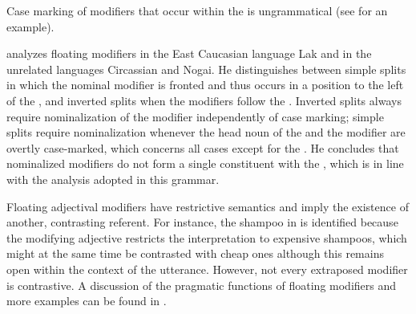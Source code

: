 \begin{exe}

\end{exe}

Case marking of modifiers that occur within the  is ungrammatical (see  for an example).

\citet{Kazenin2009} analyzes floating modifiers in the East Caucasian language Lak and in the unrelated languages Circassian and Nogai. He distinguishes between simple splits in which the nominal modifier is fronted and thus occurs in a position to the left of the , and inverted splits when the modifiers follow the . Inverted splits always require nominalization of the modifier independently of case marking; simple splits require nominalization whenever the head noun of the  and the modifier are overtly case-marked, which concerns all cases except for the . He concludes that nominalized modifiers do not form a single constituent with the , which is in line with the analysis adopted in this grammar.

Floating adjectival modifiers have restrictive semantics and imply the existence of another, contrasting referent. For instance, the shampoo in  is identified because the modifying adjective restricts the interpretation to expensive shampoos, which might at the same time be contrasted with cheap ones although this remains open within the context of the utterance. However, not every extraposed modifier is contrastive. A discussion of the pragmatic functions of floating modifiers and more examples can be found in .


